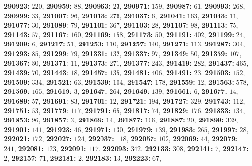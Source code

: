 \textsf{\bfseries 290923:} $220$, \textsf{\bfseries 290959:} $88$, \textsf{\bfseries 290963:} $23$, \textsf{\bfseries 290971:} $159$, \textsf{\bfseries 290987:} $61$, \textsf{\bfseries 290993:} $268$, \textsf{\bfseries 290999:} $33$, \textsf{\bfseries 291007:} $96$, \textsf{\bfseries 291013:} $276$, \textsf{\bfseries 291037:} $6$, \textsf{\bfseries 291041:} $163$, \textsf{\bfseries 291043:} $11$, \textsf{\bfseries 291077:} $30$, \textsf{\bfseries 291089:} $79$, \textsf{\bfseries 291101:} $367$, \textsf{\bfseries 291103:} $28$, \textsf{\bfseries 291107:} $98$, \textsf{\bfseries 291113:} $75$, \textsf{\bfseries 291143:} $57$, \textsf{\bfseries 291167:} $160$, \textsf{\bfseries 291169:} $158$, \textsf{\bfseries 291173:} $50$, \textsf{\bfseries 291191:} $402$, \textsf{\bfseries 291199:} $24$, \textsf{\bfseries 291209:} $6$, \textsf{\bfseries 291217:} $51$, \textsf{\bfseries 291253:} $110$, \textsf{\bfseries 291257:} $140$, \textsf{\bfseries 291271:} $113$, \textsf{\bfseries 291287:} $304$, \textsf{\bfseries 291293:} $85$, \textsf{\bfseries 291299:} $79$, \textsf{\bfseries 291331:} $132$, \textsf{\bfseries 291337:} $97$, \textsf{\bfseries 291349:} $50$, \textsf{\bfseries 291359:} $107$, \textsf{\bfseries 291367:} $80$, \textsf{\bfseries 291371:} $11$, \textsf{\bfseries 291373:} $271$, \textsf{\bfseries 291377:} $243$, \textsf{\bfseries 291419:} $282$, \textsf{\bfseries 291437:} $465$, \textsf{\bfseries 291439:} $70$, \textsf{\bfseries 291443:} $18$, \textsf{\bfseries 291457:} $135$, \textsf{\bfseries 291481:} $406$, \textsf{\bfseries 291491:} $23$, \textsf{\bfseries 291503:} $152$, \textsf{\bfseries 291509:} $334$, \textsf{\bfseries 291521:} $63$, \textsf{\bfseries 291539:} $104$, \textsf{\bfseries 291547:} $178$, \textsf{\bfseries 291559:} $12$, \textsf{\bfseries 291563:} $578$, \textsf{\bfseries 291569:} $165$, \textsf{\bfseries 291619:} $3$, \textsf{\bfseries 291647:} $264$, \textsf{\bfseries 291649:} $139$, \textsf{\bfseries 291661:} $6$, \textsf{\bfseries 291677:} $14$, \textsf{\bfseries 291689:} $57$, \textsf{\bfseries 291691:} $83$, \textsf{\bfseries 291701:} $12$, \textsf{\bfseries 291721:} $194$, \textsf{\bfseries 291727:} $329$, \textsf{\bfseries 291743:} $112$, \textsf{\bfseries 291751:} $53$, \textsf{\bfseries 291779:} $117$, \textsf{\bfseries 291791:} $65$, \textsf{\bfseries 291817:} $74$, \textsf{\bfseries 291829:} $176$, \textsf{\bfseries 291833:} $134$, \textsf{\bfseries 291853:} $96$, \textsf{\bfseries 291857:} $3$, \textsf{\bfseries 291869:} $14$, \textsf{\bfseries 291877:} $106$, \textsf{\bfseries 291887:} $20$, \textsf{\bfseries 291899:} $339$, \textsf{\bfseries 291901:} $141$, \textsf{\bfseries 291923:} $46$, \textsf{\bfseries 291971:} $130$, \textsf{\bfseries 291979:} $139$, \textsf{\bfseries 291983:} $265$, \textsf{\bfseries 291997:} $28$, \textsf{\bfseries 292021:} $172$, \textsf{\bfseries 292027:} $124$, \textsf{\bfseries 292037:} $118$, \textsf{\bfseries 292057:} $102$, \textsf{\bfseries 292069:} $44$, \textsf{\bfseries 292079:} $241$, \textsf{\bfseries 292081:} $123$, \textsf{\bfseries 292091:} $117$, \textsf{\bfseries 292093:} $342$, \textsf{\bfseries 292133:} $308$, \textsf{\bfseries 292141:} $7$, \textsf{\bfseries 292147:} $2$, \textsf{\bfseries 292157:} $71$, \textsf{\bfseries 292181:} $2$, \textsf{\bfseries 292183:} $13$, \textsf{\bfseries 292223:} $67$, 

